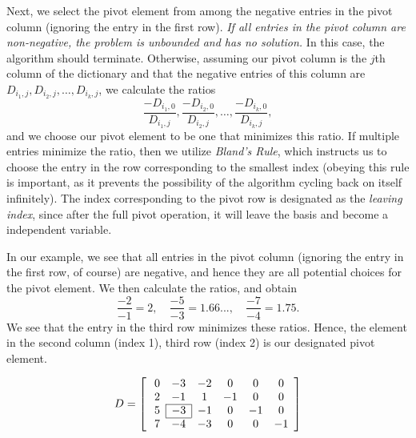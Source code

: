 Next, we select the pivot element from among the negative entries in the pivot column (ignoring the entry in the first row).
\emph{If all entries in the pivot column are non-negative, the problem is unbounded and has no solution.}
In this case, the algorithm should terminate.
Otherwise, assuming our pivot column is the $j$th column of the dictionary and that the negative entries of this column are
$D_{i_1, j}, D_{i_2, j}, \ldots, D_{i_k, j}$, we calculate the ratios
\[
\frac{-D_{i_1,0}}{D_{i_1,j}}, \frac{-D_{i_2,0}}{D_{i_2,j}}, \ldots, \frac{-D_{i_k,0}}{D_{i_k,j}},
\]
and we choose our pivot element to be one that minimizes this ratio.
If multiple entries minimize the ratio, then we utilize \emph{Bland's Rule}, which instructs us to choose the entry in the row corresponding to the smallest index (obeying this rule is important, as it prevents the possibility of the algorithm cycling back on itself infinitely).
The index corresponding to the pivot row is designated as the \emph{leaving index}, since after the full pivot operation, it will leave the basis and become a independent variable.

In our example, we see that all entries in the pivot column (ignoring the entry in the first row, of course) are negative, and hence they are all potential choices for the pivot element.
We then calculate the ratios, and obtain
\[
\frac{-2}{-1} = 2,\quad \frac{-5}{-3} = 1.66...,\quad \frac{-7}{-4} = 1.75.
\]
We see that the entry in the third row minimizes these ratios.
Hence, the element in the second column (index 1), third row (index 2) is our designated
pivot element.

\[ D = \left[ \:
\begin{array}{*{7}{c}}

0 & -3 & -2 & 0 & 0 & 0\\
2 & -1 & 1 & -1 & 0 & 0\\\cline{2-2}
5 & \multicolumn{1}{|c}{-3} & \multicolumn{1}{|c}{-1} & 0 & -1 & 0\\\cline{2-2}
7 & -4 & -3 & 0 & 0 & -1\\
\end{array}
\right] \]

